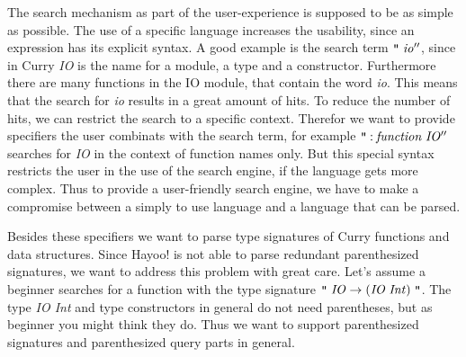 \documentclass[%
	pdftex,%
	a4paper,%
	oneside,%
	chapterprefix,%
	headsepline,%
	12pt%
]{scrbook}
\newcommand{\Conid}[1]{\mathit{#1}}
\newcommand{\Varid}[1]{\mathit{#1}}
\begin{document}
The search mechanism as part of the user-experience is supposed to be
as simple as possible. The use of a specific language increases the
usability, since an expression has its explicit syntax. A good example
is the search term \ensuremath{\text{\tt ''}\;\Varid{io''}}, since in Curry \emph{IO} is the name for
a module, a type and a constructor. Furthermore there are many
functions in the IO module, that contain the word \emph{io}. This
means that the search for \emph{io} results in a great amount of
hits. To reduce the number of hits, we can restrict the search to
a specific context. Therefor we want to provide specifiers the user
combinats with the search term, for example
\ensuremath{\text{\tt ''}\mathbin{:}\Varid{function}\;\Conid{IO''}} searches for \emph{IO} in the context of function
names only. But this special syntax restricts the user in the use of
the search engine, if the language gets more complex. Thus to provide
a user-friendly search engine, we have to make a compromise between a
simply to use language and a language that can be parsed.

Besides these specifiers we want to parse type signatures of Curry
functions and data structures. Since Hayoo! is not able to parse
redundant parenthesized signatures, we want to address this problem
with great care. Let's assume a beginner searches for a function with
the type signature \ensuremath{\text{\tt ''}\;\Conid{IO}\to (\Conid{IO}\;\Conid{Int})\;\text{\tt ''}}. The type \emph{IO Int} and
type constructors in general do not need parentheses, but as beginner
you might think they do. Thus we want to support parenthesized
signatures and parenthesized query parts in general.
\end{document}
